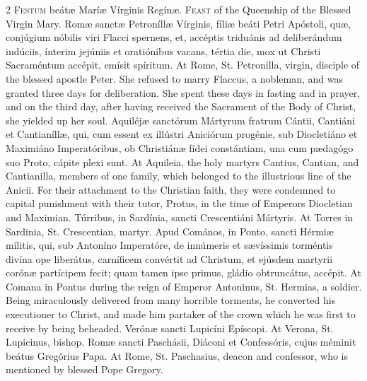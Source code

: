 \begin{paracol}{2}
\lettrine[lines=1]{F}{estum} beátæ Maríæ Vírginis Regínæ.
\switchcolumn
{}
\lettrine[lines=1]{F}{east} of the Queenship of the Blessed Virgin Mary.
\switchcolumn*
{}
Romæ sanctæ Petroníllæ 
 Vírginis, fíliæ beáti Petri Apóstoli, quæ, conjúgium nóbilis viri Flacci 
 spernens, et, accéptis triduánis ad deliberándum indúciis, ínterim jejúniis 
 et oratiónibus vacans, tértia die, mox ut Christi Sacraméntum accépit, 
 emísit spíritum.
\switchcolumn
{}
At Rome, St. Petronilla, virgin, 
 disciple of the blessed apostle Peter. She refused to marry Flaccus, a 
 nobleman, and was granted three days for deliberation. She spent these 
 days in fasting and in prayer, and on the third day, after having received 
 the Sacrament of the Body of Christ, she yielded up her soul.
\switchcolumn*
{}
Aquiléjæ sanctórum 
 Mártyrum fratrum Cántii, Cantiáni et Cantianíllæ, qui, cum essent ex 
 illústri Aniciórum progénie, sub Diocletiáno et Maximiáno Imperatóribus, ob 
 Christiánæ fídei constántiam, una cum pædagógo suo Proto, cápite plexi sunt.
\switchcolumn
{}
At Aquileia, the holy martyrs 
 Cantius, Cantian, and Cantianilla, members of one family, which belonged to 
 the illustrious line of the Anicii. For their attachment to the 
 Christian faith, they were condemned to capital punishment with their tutor, 
 Protus, in the time of Emperors Diocletian and Maximian.
\switchcolumn*
{}
Túrribus, in Sardínia, sancti Crescentiáni Mártyris.
\switchcolumn
{}
At Torres in Sardinia, St. 
 Crescentian, martyr.
\switchcolumn*
{}
Apud Comános, in Ponto, 
 sancti Hérmiæ mílitis, qui, sub Antoníno Imperatóre, de innúmeris et 
 sævíssimis torméntis divína ope liberátus, carníficem convértit ad Christum, 
 et ejúsdem martyrii corónæ partícipem fecit; quam tamen ipse primus, gládio 
 obtruncátus, accépit.
\switchcolumn
{}
At Comana in Pontus during the 
 reign of Emperor Antoninus, St. Hermias, a soldier. Being miraculously 
 delivered from many horrible torments, he converted his executioner to 
 Christ, and made him partaker of the crown which he was first to receive by 
 being beheaded.
\switchcolumn*
{}
Verónæ sancti Lupicíni 
 Epíscopi.
\switchcolumn
{}
At Verona, St. Lupicinus, bishop.
\switchcolumn*
{}
Romæ sancti Paschásii, 
 Diáconi et Confessóris, cujus méminit beátus Gregórius Papa.
\switchcolumn
{}
At Rome, St. Paschasius, deacon and 
 confessor, who is mentioned by blessed Pope Gregory.
\switchcolumn*
{}
\end{paracol}
